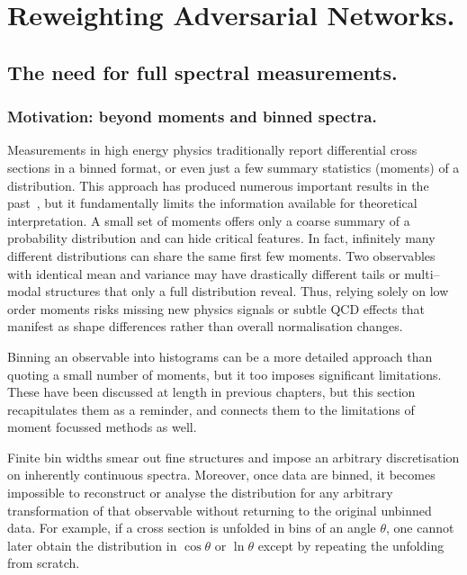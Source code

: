 \chapter{Reweighting Adversarial Networks.}
\label{chap:ran}
\chapterminitoc
\section{The need for full spectral measurements.}
    \label{sec:need-for-density-unfolding}
    \sectionminitoc
    \subsection{Motivation: beyond moments and binned spectra.}
    Measurements in high energy physics traditionally report differential cross sections in a binned format, or even just a few summary statistics (moments) of a distribution. 
    This approach has produced numerous important results in the past~\cite{GomezAmbrosio:2022mpm, Benato:2025rgo, ATLAS:2017dhr, alhroobSingleTopQuark,cowan_statistical_1998}, but it fundamentally limits the information available for theoretical interpretation.
    A small set of moments offers only a coarse summary of a probability distribution and can hide critical features.
    In fact, infinitely many different distributions can share the same first few moments.
    Two observables with identical mean and variance may have drastically different tails or multi--modal structures that only a full distribution reveal.
    Thus, relying solely on low order moments risks missing new physics signals or subtle QCD effects that manifest as shape differences rather than overall normalisation changes.

    Binning an observable into histograms can be a more detailed approach than quoting a small number of moments, but it too imposes significant limitations.
    These have been discussed at length in previous chapters, but this section recapitulates them as a reminder, and connects them to the limitations of moment focussed methods as well.
    
    Finite bin widths smear out fine structures and impose an arbitrary discretisation on inherently continuous spectra.
    Moreover, once data are binned, it becomes impossible to reconstruct or analyse the distribution for any arbitrary transformation of that observable without returning to the original unbinned data.
    For example, if a cross section is unfolded in bins of an angle $\theta$, one cannot later obtain the distribution in $\cos\theta$ or $\ln\theta$ except by repeating the unfolding from scratch.
    
